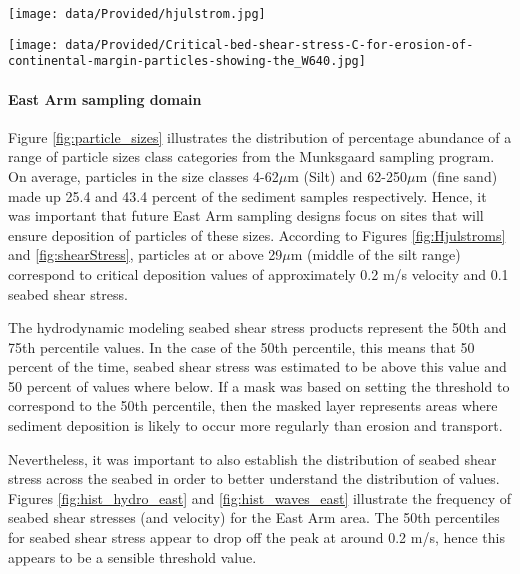 \documentclass[a4paper]{article}
\let\origfigure=\figure
\let\endorigfigure=\endfigure
\renewenvironment{figure}[1][]{%
   \origfigure[H]
}{%
   \endorigfigure
}
\begin{document}
\begin{figure}
\centering\scriptsize
\texttt{[image: data/Provided/hjulstrom.jpg]}
\caption{Hjulstrom Curve linking sediment size and the velocity needed
to erode, transport or deposit (from
\url{https://www.thegeoroom.co.zw/hydrology/hjulstrom-curve.php}).\label{fig:Hjulstroms}}
\end{figure}

\begin{figure}
\centering\scriptsize
\texttt{[image: data/Provided/Critical-bed-shear-stress-C-for-erosion-of-continental-margin-particles-showing-the\_W640.jpg]}
\caption{Critical bed shear stress for erosion and particle settling
velocity of a range of particle sizes from Thomsen
(2002)\label{fig:shearStress}}
\end{figure}

\hypertarget{east-arm-sampling-domain}{%
\paragraph{East Arm sampling domain}\label{east-arm-sampling-domain}}

Figure \ref{fig:particle_sizes} illustrates the distribution of
percentage abundance of a range of particle sizes class categories from
the Munksgaard sampling program. On average, particles in the size
classes 4-62\(\mu\)m (Silt) and 62-250\(\mu\)m (fine sand) made up 25.4
and 43.4 percent of the sediment samples respectively. Hence, it was
important that future East Arm sampling designs focus on sites that will
ensure deposition of particles of these sizes. According to Figures
\ref{fig:Hjulstroms} and \ref{fig:shearStress}, particles at or above
29\(\mu\)m (middle of the silt range) correspond to critical deposition
values of approximately 0.2 m/s velocity and 0.1 seabed shear stress.

The hydrodynamic modeling seabed shear stress products represent the
50th and 75th percentile values. In the case of the 50th percentile,
this means that 50 percent of the time, seabed shear stress was
estimated to be above this value and 50 percent of values where below.
If a mask was based on setting the threshold to correspond to the 50th
percentile, then the masked layer represents areas where sediment
deposition is likely to occur more regularly than erosion and transport.

Nevertheless, it was important to also establish the distribution of
seabed shear stress across the seabed in order to better understand the
distribution of values. Figures \ref{fig:hist_hydro_east} and
\ref{fig:hist_waves_east} illustrate the frequency of seabed shear
stresses (and velocity) for the East Arm area. The 50th percentiles for
seabed shear stress appear to drop off the peak at around 0.2 m/s, hence
this appears to be a sensible threshold value.
\end{document}
